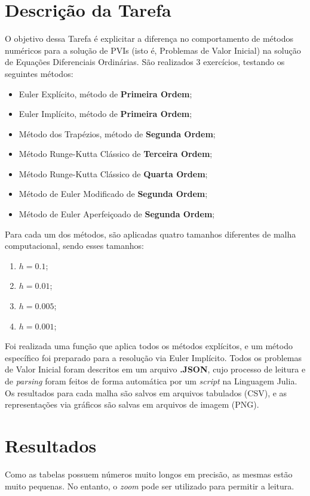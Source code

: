 \documentclass[12pt]{article}
\begin{document}


\singlespacing
\newpage
\tableofcontents

\newpage
\section{Descrição da Tarefa}
O objetivo dessa Tarefa é explicitar a diferença no comportamento de métodos numéricos para a solução de PVIs (isto é, Problemas de Valor Inicial) na solução de Equações Diferenciais Ordinárias. São realizados 3 exercícios, testando os seguintes métodos:
\begin{itemize}
    \item Euler Explícito, método de \textbf{Primeira Ordem};
    \item Euler Implícito, método de \textbf{Primeira Ordem};
    \item Método dos Trapézios, método de \textbf{Segunda Ordem};
    \item Método Runge-Kutta Clássico de \textbf{Terceira Ordem};
    \item Método Runge-Kutta Clássico de \textbf{Quarta Ordem};
    \item Método de Euler Modificado de \textbf{Segunda Ordem};
    \item Método de Euler Aperfeiçoado de \textbf{Segunda Ordem};
\end{itemize}
Para cada um dos métodos, são aplicadas quatro tamanhos diferentes de malha computacional, sendo esses tamanhos:
\begin{enumerate}
    \item $h=0.1$;
    \item $h=0.01$;
    \item $h=0.005$;
    \item $h=0.001$;
\end{enumerate}

Foi realizada uma função que aplica todos os métodos explícitos, e um método específico foi preparado para a resolução via Euler Implícito. Todos os problemas de Valor Inicial foram descritos em um arquivo \textbf{.JSON}, cujo processo de leitura e de \textit{parsing} foram feitos de forma automática por um \textit{script} na Linguagem Julia. Os resultados para cada malha são salvos em arquivos tabulados (CSV), e as representações via gráficos são salvas em arquivos de imagem (PNG).

\section{Resultados}
Como as tabelas possuem números muito longos em precisão, as mesmas estão muito pequenas. No entanto, o \textit{zoom} pode ser utilizado para permitir a leitura.
\end{document}

